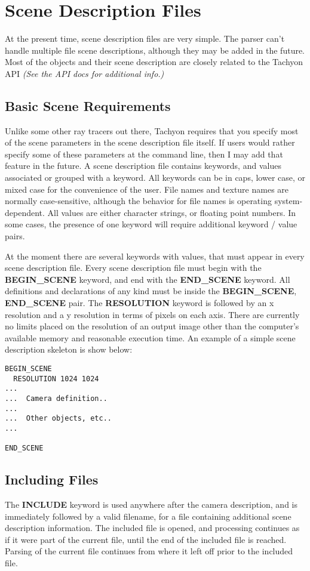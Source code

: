 \section{Scene Description Files}
  At the present time, scene description files are very simple.  
The parser can't handle multiple file scene descriptions, although they
may be added in the future.  Most of the objects and their scene description
are closely related to the Tachyon API 
{\em (See the API docs for additional info.)}

\subsection{Basic Scene Requirements}
  Unlike some other ray tracers out there, Tachyon requires that you 
specify most of the scene parameters in the scene description file itself.
If users would rather specify some of these parameters at the command line,
then I may add that feature in the future.  
A scene description file contains keywords, and values associated or grouped
with a keyword.  All keywords can be in caps, lower case, or mixed case
for the convenience of the user.  File names and texture names are 
normally case-sensitive, although the behavior for file names is 
operating system-dependent.  All values are either character strings, or
floating point numbers.  In some cases, the presence of one keyword will
require additional keyword / value pairs. 

  At the moment there are several keywords with values, 
that must appear in every scene description file.  
Every scene description file must begin with the 
{\bf BEGIN\_SCENE} keyword, and end with the {\bf END\_SCENE} keyword.
All definitions and declarations of any kind must be inside the 
{\bf BEGIN\_SCENE}, {\bf END\_SCENE} pair.
The {\bf RESOLUTION} keyword is followed by an x resolution
and a y resolution in terms of pixels on each axis.  There are currently 
no limits placed on the resolution of an output image other than the
computer's available memory and reasonable execution time.
An example of a simple scene description skeleton is show below:
\begin{verbatim}
BEGIN_SCENE
  RESOLUTION 1024 1024 
...
...  Camera definition..
...
...  Other objects, etc..
...

END_SCENE
\end{verbatim}



\subsection{Including Files}
The {\bf INCLUDE} keyword is used anywhere after the camera description,
and is immediately followed by a valid filename, for a file containing
additional scene description information.  The included file is opened,
and processing continues as if it were part of the current file, until
the end of the included file is reached.  Parsing of the current file
continues from where it left off prior to the included file.  

